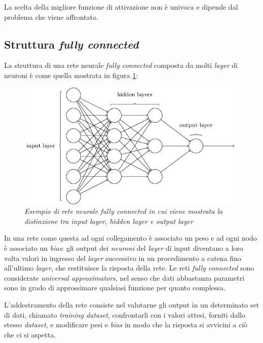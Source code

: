 \documentclass[12pt,a4paper]{report}
\begin{document}
La scelta della migliore funzione di attivazione non è univoca e dipende dal problema che viene affrontato.

\newpage

\subsection{Struttura \textit{fully connected}}

La struttura di una rete neurale \textit{fully connected} composta da molti \textit{layer} di neuroni è come quella mostrata in figura \ref{net}:

\begin{figure}[H]
 \centering
 \includegraphics[scale = 0.5]{images/net.png}
 \caption{\textit{Esempio di rete neurale fully connected in cui viene mostrata la distinzione tra input layer, hidden layer e output layer}}
 \label{net}
\end{figure} 

In una rete come questa ad ogni collegamento è associato un peso e ad ogni nodo è associato un \textit{bias}: gli output dei \textit{neuroni} del \textit{layer} di input diventano a loro volta valori in ingresso del \textit{layer} successivo in un procedimento a catena fino all'ultimo \textit{layer}, che restituisce la risposta della rete. 
Le reti \textit{fully connected} sono considerate \textit{universal approximators}, nel senso che dati abbastanza parametri sono in grado di approssimare qualsiasi funzione per quanto complessa.\cite{neural-net-nielsen}

L'addestramento della rete consiste nel valutarne gli output in un determinato set di dati, chiamato \textit{training dataset}, confrontarli con i valori attesi, forniti dallo stesso \textit{dataset}, e modificare pesi e \textit{bias} in modo che la risposta si avvicini a ciò che ci si aspetta.
\end{document}
